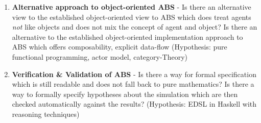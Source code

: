 \begin{enumerate}
	\item \textbf{Alternative approach to object-oriented ABS} - Is there an alternative view to the established object-oriented view to ABS which does treat agents \textit{not} like objects and does not mix the concept of agent and object? Is there an alternative to the established object-oriented implementation approach to ABS which offers composability, explicit data-flow (Hypothesis: pure functional programming, actor model, category-Theory)
	\item \textbf{Verification \& Validation of ABS} - Is there a way for formal specification which is still readable and does not fall back to pure mathematics? Is there a way to formally specify hypotheses about the simulation which are then checked automatically against the results? (Hypothesis: EDSL in Haskell with reasoning techniques)
\end{enumerate}